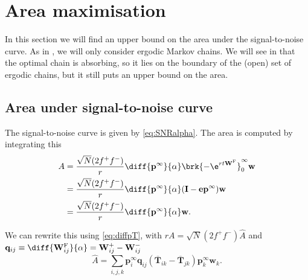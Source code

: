 \documentclass[12pt]{article}
\newcommand{\I}{\mathbf{I}}
\newcommand{\onev}{\mathbf{e}}
\newcommand{\eq}{\mathbf{p}^\infty}
\newcommand{\fpt}{\mathbf{T}}
\newcommand{\fptb}{\overline{\fpt}}
\newcommand{\w}{\mathbf{w}}
\newcommand{\W}{\mathbf{W}}
\newcommand{\enc}{\mathbf{q}}
\newcommand{\frg}{\W^{\mathrm{F}}}
\DeclareMathOperator{\SNR}{SNR}
\begin{document}
\section{Area maximisation}\label{sec:areamax}

In this section we will find an upper bound on the area under the signal-to-noise curve.
As in , we will only consider ergodic Markov chains.
We will see in  that the optimal chain is absorbing, so it lies on the boundary of the (open) set of ergodic chains, but it still puts an upper bound on the area.

\subsection{Area under signal-to-noise curve}\label{sec:area}

The signal-to-noise curve is given by \eqref{eq:SNRalpha}.
The area is computed by integrating this
%
\begin{equation}\label{eq:area}
\begin{aligned}
  A &= \frac{\sqrt{N}(2f^+f^-)}{r} \diff{\eq}{\alpha} \brk{-\e^{rt\frg}}_0^\infty \w \\
    &= \frac{\sqrt{N}(2f^+f^-)}{r} \diff{\eq}{\alpha} (\I-\onev\eq) \w \\
    &= \frac{\sqrt{N}(2f^+f^-)}{r} \diff{\eq}{\alpha} \w.
\end{aligned}
\end{equation}
%

We can rewrite this using \eqref{eq:diffpT}, with $rA=\sqrt{N}(2f^+f^-)\hat{A}$ and $\enc_{ij} \equiv \diff{\frg_{ij}}{\alpha}=\W^+_{ij}-\W^-_{ij}$
%
\begin{equation}\label{eq:areaT}
  \hat{A} = \sum_{i,j,k} \eq_i \enc_{ij} (\fptb_{ik} - \fptb_{jk}) \eq_k \w_k.
\end{equation}
%
\end{document}
